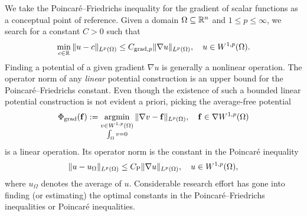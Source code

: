 \documentclass[a4paper]{article}
\begin{document}
We take the Poincar\'e--Friedrichs inequality for the gradient of scalar functions as a conceptual point of reference.
Given a domain $\Omega \subseteq {\mathbb R}^n$ and $1 \leq p \leq \infty$,
we search for a constant $C > 0$ such that 
\begin{align*}
    \min\limits_{c\in{\mathbb R}}
    \| u - c \|_{L^{p}(\Omega)}
    \leq 
    C_{\operatorname{grad},p} \| \nabla u \|_{L^p(\Omega)},
    \quad 
    u \in W^{1,p}(\Omega)
    .
\end{align*}
Finding a potential of a given gradient $\nabla u$ is generally a nonlinear operation. 
The operator norm of any \emph{linear} potential construction is an upper bound for the Poincar\'e--Friedrichs constant. 
Even though the existence of such a bounded linear potential construction is not evident a priori, 
picking the average-free potential 
\begin{align*}
    \Phi_{\operatorname{grad}}( {\mathbf f} ) 
    := 
    \operatorname*{{\rm argmin}}\limits_{ \substack{ v \in W^{1,p}(\Omega) \\ \int_\Omega v = 0 } } \| \nabla v - {\mathbf f} \|_{L^{p}(\Omega)},
    \quad 
    {\mathbf f} \in \nabla W^{1,p}(\Omega)
\end{align*}
is a linear operation. Its operator norm is the constant in the Poincar\'e inequality 
\begin{align*}
    \| u - u_{\Omega} \|_{L^{p}(\Omega)}
    \leq 
    C_{\rm P} \| \nabla u \|_{L^p(\Omega)},
    \quad 
    u \in W^{1,p}(\Omega)
    ,
\end{align*}
where $u_\Omega$ denotes the average of $u$.
Considerable research effort has gone into finding (or estimating) the optimal constants in the Poincar\'e--Friedrichs inequalities or Poincar\'e inequalities. 
\end{document}
